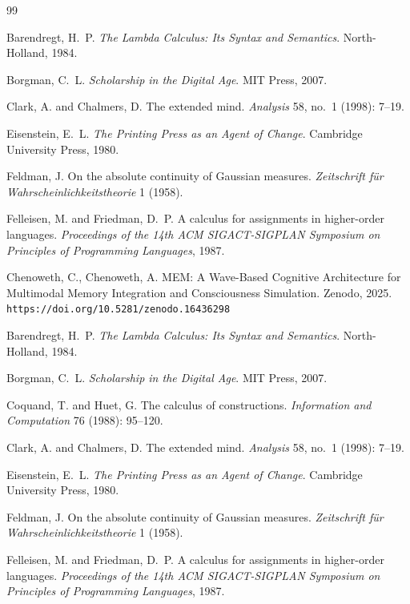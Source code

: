 \documentclass[12pt, a4paper, openany]{book}
\theoremstyle{plain}
\theoremstyle{definition}
\theoremstyle{remark}
\begin{document}
\begin{thebibliography}{99}

Barendregt, H.~P. \emph{The Lambda Calculus: Its Syntax and Semantics}.
North-Holland, 1984.

Borgman, C.~L. \emph{Scholarship in the Digital Age}. MIT Press, 2007.

Clark, A. and Chalmers, D. The extended mind. \emph{Analysis} 58, no.~1 (1998):
7--19.

Eisenstein, E.~L. \emph{The Printing Press as an Agent of Change}. Cambridge
University Press, 1980.

Feldman, J. On the absolute continuity of Gaussian measures. \emph{Zeitschrift
f\"ur Wahrscheinlichkeitstheorie} 1 (1958).

Felleisen, M. and Friedman, D.~P. A calculus for assignments in higher-order
languages. \emph{Proceedings of the 14th ACM SIGACT-SIGPLAN Symposium on
Principles of Programming Languages}, 1987.


Chenoweth, C., Chenoweth, A.
MEM: A Wave-Based Cognitive Architecture for Multimodal Memory Integration
and Consciousness Simulation. Zenodo, 2025.
\texttt{https://doi.org/10.5281/zenodo.16436298}

Barendregt, H.~P. \emph{The Lambda Calculus: Its Syntax and Semantics}.
North-Holland, 1984.

Borgman, C.~L. \emph{Scholarship in the Digital Age}. MIT Press, 2007.

Coquand, T. and Huet, G. The calculus of constructions.
\emph{Information and Computation} 76 (1988): 95--120.

Clark, A. and Chalmers, D. The extended mind. \emph{Analysis} 58, no.~1 (1998):
7--19.

Eisenstein, E.~L. \emph{The Printing Press as an Agent of Change}. Cambridge
University Press, 1980.

Feldman, J. On the absolute continuity of Gaussian measures. \emph{Zeitschrift
f\"ur Wahrscheinlichkeitstheorie} 1 (1958).

Felleisen, M. and Friedman, D.~P. A calculus for assignments in higher-order
languages. \emph{Proceedings of the 14th ACM SIGACT-SIGPLAN Symposium on
Principles of Programming Languages}, 1987.


\end{thebibliography}
\end{document}
